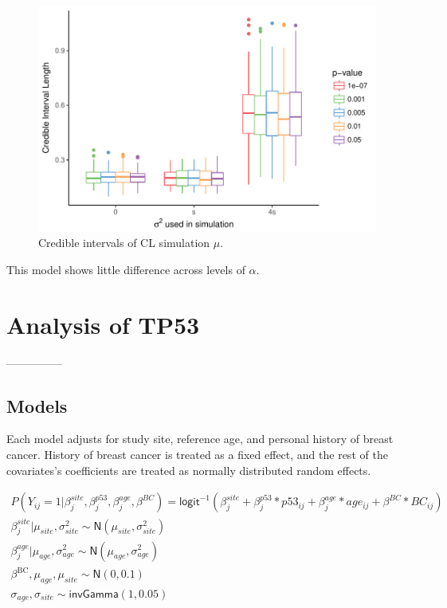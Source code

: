 \documentclass[AMA,STIX1COL]{WileyNJD-v2}\usepackage[]{graphicx}\usepackage[]{color}
\newenvironment{knitrout}{}{} %
\begin{document}
\begin{figure}
\caption{Credible intervals of CL simulation $\mu$.}

\begin{knitrout}
\color{fgcolor}

{\centering \includegraphics[width=6in]{figure/unnamed-chunk-28-1} 

}



\end{knitrout}
\end{figure}
This model shows little difference across levels of $\alpha$.

\section{Analysis of TP53}\label{sec:tp53}
---------------
\subsection{Models}


Each model adjusts for study site, reference age, and personal history of breast cancer. History of breast cancer is treated as a fixed effect, and the rest of the covariates's coefficients are treated as normally distributed random effects. 

\begin{gather}
P(Y_{ij}=1| \beta^{site}_{ j}, \beta^{p53}_{j}, \beta^{age}_{j},\beta^{BC}) = \textsf{logit}^{-1}(\beta^{site}_{ j}+ \beta^{p53}_{j}*p53_{ij}+ \beta^{age}_{j}*age_{ij}+\beta^{BC}* BC_{ij})\\
\beta^{site}_{ j}|\mu_{site}, \sigma_{site}^{2}\sim \textsf{N}(\mu_{site}, \sigma_{site}^{2})\\
\beta^{age}_{j}|\mu_{age}, \sigma^{2}_{age}\sim \textsf{N}(\mu_{age}, \sigma^{2}_{age})\\
\beta^{\text{BC}}, \mu_{age},\mu_{site}\sim \textsf{N}(0,0.1)\\
\sigma_{age},\sigma_{site} \sim \textsf{invGamma}(1, 0.05)
\end{gather}
\end{document}
